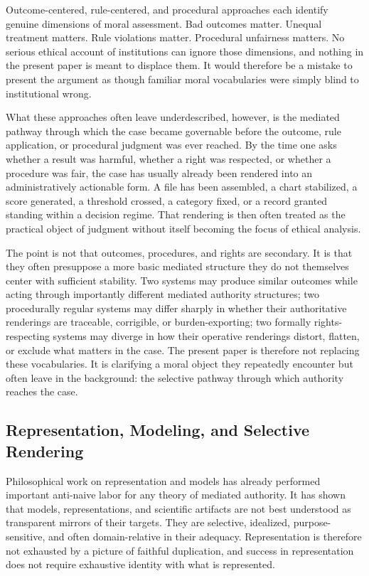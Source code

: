 \documentclass[11pt]{article}
\begin{document}
Outcome-centered, rule-centered, and procedural approaches each identify genuine dimensions of moral assessment. Bad outcomes matter. Unequal treatment matters. Rule violations matter. Procedural unfairness matters. No serious ethical account of institutions can ignore those dimensions, and nothing in the present paper is meant to displace them. It would therefore be a mistake to present the argument as though familiar moral vocabularies were simply blind to institutional wrong.

What these approaches often leave underdescribed, however, is the mediated pathway through which the case became governable before the outcome, rule application, or procedural judgment was ever reached. By the time one asks whether a result was harmful, whether a right was respected, or whether a procedure was fair, the case has usually already been rendered into an administratively actionable form. A file has been assembled, a chart stabilized, a score generated, a threshold crossed, a category fixed, or a record granted standing within a decision regime. That rendering is then often treated as the practical object of judgment without itself becoming the focus of ethical analysis.

The point is not that outcomes, procedures, and rights are secondary. It is that they often presuppose a more basic mediated structure they do not themselves center with sufficient stability. Two systems may produce similar outcomes while acting through importantly different mediated authority structures; two procedurally regular systems may differ sharply in whether their authoritative renderings are traceable, corrigible, or burden-exporting; two formally rights-respecting systems may diverge in how their operative renderings distort, flatten, or exclude what matters in the case. The present paper is therefore not replacing these vocabularies. It is clarifying a moral object they repeatedly encounter but often leave in the background: the selective pathway through which authority reaches the case.

\subsection{Representation, Modeling, and Selective Rendering}

Philosophical work on representation and models has already performed important anti-naive labor for any theory of mediated authority. It has shown that models, representations, and scientific artifacts are not best understood as transparent mirrors of their targets. They are selective, idealized, purpose-sensitive, and often domain-relative in their adequacy. Representation is therefore not exhausted by a picture of faithful duplication, and success in representation does not require exhaustive identity with what is represented. \cite{FriggNguyen2021ScientificRepresentationSEP,FriggHartmann2025ModelsScienceSEP}
\end{document}
